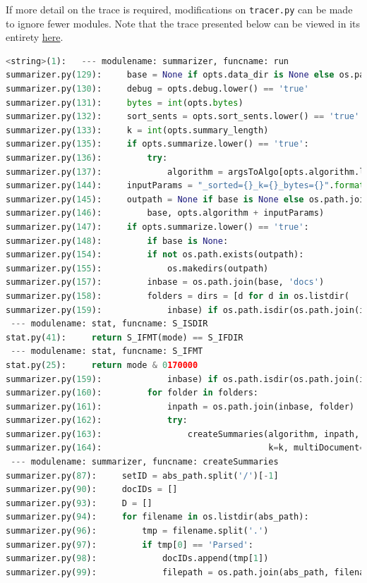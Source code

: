 \documentclass[10pt]{article}
\begin{document}
If more detail on the trace is required, modifications on \verb|tracer.py| can be made to ignore fewer modules. Note that the trace presented below can be viewed in its entirety \href{https://raw.githubusercontent.com/kandluis/document_summaries/master/trace.out}{here}.
\begin{lstlisting}[breaklines,language=Python]
<string>(1):   --- modulename: summarizer, funcname: run
summarizer.py(129):     base = None if opts.data_dir is None else os.path.abspath(opts.data_dir)
summarizer.py(130):     debug = opts.debug.lower() == 'true'
summarizer.py(131):     bytes = int(opts.bytes)
summarizer.py(132):     sort_sents = opts.sort_sents.lower() == 'true'
summarizer.py(133):     k = int(opts.summary_length)
summarizer.py(135):     if opts.summarize.lower() == 'true':
summarizer.py(136):         try:
summarizer.py(137):             algorithm = argsToAlgo[opts.algorithm.lower()]
summarizer.py(144):     inputParams = "_sorted={}_k={}_bytes={}".format(sort_sents, k, bytes)
summarizer.py(145):     outpath = None if base is None else os.path.join(
summarizer.py(146):         base, opts.algorithm + inputParams)
summarizer.py(147):     if opts.summarize.lower() == 'true':
summarizer.py(148):         if base is None:
summarizer.py(154):         if not os.path.exists(outpath):
summarizer.py(155):             os.makedirs(outpath)
summarizer.py(157):         inbase = os.path.join(base, 'docs')
summarizer.py(158):         folders = dirs = [d for d in os.listdir(
summarizer.py(159):             inbase) if os.path.isdir(os.path.join(inbase, d))]
 --- modulename: stat, funcname: S_ISDIR
stat.py(41):     return S_IFMT(mode) == S_IFDIR
 --- modulename: stat, funcname: S_IFMT
stat.py(25):     return mode & 0170000
summarizer.py(159):             inbase) if os.path.isdir(os.path.join(inbase, d))]
summarizer.py(160):         for folder in folders:
summarizer.py(161):             inpath = os.path.join(inbase, folder)
summarizer.py(162):             try:
summarizer.py(163):                 createSummaries(algorithm, inpath, outpath, sort_sents, bytes=bytes,
summarizer.py(164):                                 k=k, multiDocument=True)
 --- modulename: summarizer, funcname: createSummaries
summarizer.py(87):     setID = abs_path.split('/')[-1]
summarizer.py(90):     docIDs = []
summarizer.py(93):     D = []
summarizer.py(94):     for filename in os.listdir(abs_path):
summarizer.py(96):         tmp = filename.split('.')
summarizer.py(97):         if tmp[0] == 'Parsed':
summarizer.py(98):             docIDs.append(tmp[1])
summarizer.py(99):             filepath = os.path.join(abs_path, filename)

\end{lstlisting}
\end{document}
